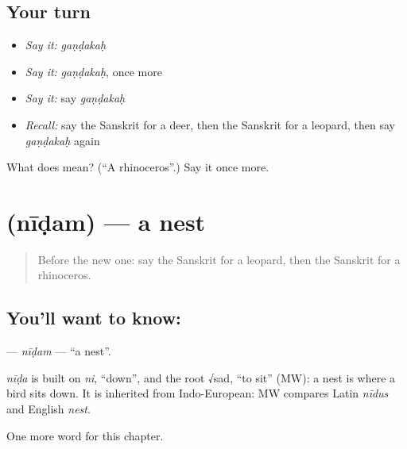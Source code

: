 \subsection*{Your turn}
\begin{itemize}
\raggedright
  \item \emph{Say it:} \emph{gaṇḍakaḥ}
  \item \emph{Say it:} \emph{gaṇḍakaḥ}, once more
  \item \emph{Say it:} say \emph{gaṇḍakaḥ}
  \item \emph{Recall:} say the Sanskrit for a deer, then the Sanskrit for a leopard, then say \emph{gaṇḍakaḥ} again
\end{itemize}

\begin{tcolorbox}[breakable,colback=teal!4,colframe=teal!35!black,title={Before you move on}]
What does  mean? (\textquotedblleft{}A rhinoceros\textquotedblright{}.) Say it once more.
\end{tcolorbox}
\section[\texorpdfstring{\sk{नीडम्} (nīḍam)}{नीडम् (nīḍam)}]{ (nīḍam) — a nest}

\label{lesson:SA-C198-nidam}



\begin{quote}
Before the new one: say the Sanskrit for a leopard, then the Sanskrit for a rhinoceros.
\end{quote}

\subsection*{You'll want to know: }
\textbf{} — \emph{nīḍam} — \textquotedblleft{}a nest\textquotedblright{}.

\begin{cousinweb}
\emph{nīḍa} is built on \emph{ni}, \textquotedblleft{}down\textquotedblright{}, and the root √sad, \textquotedblleft{}to sit\textquotedblright{} (MW): a nest is where a bird sits down. It is inherited from Indo-European: MW compares Latin \emph{nīdus} and English \emph{nest}.
\end{cousinweb}

\begin{grammarlens}[title={What you've built}]
One more word for this chapter.
\end{grammarlens}

